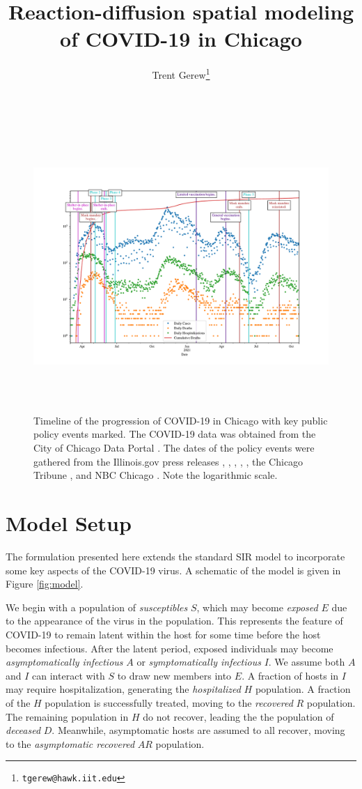 \documentclass[11pt]{article}
\title{Reaction-diffusion spatial modeling of COVID-19 in Chicago}
\author{Trent Gerew\thanks{\texttt{tgerew@hawk.iit.edu}}}
\institute{Department of Applied Mathematics, Illinois Institute of Technology, Chicago, Illinois}
\begin{document}
\maketitle

	\begin{figure}[h]
		\centering
		\includegraphics[height=11cm]{chicago-data2}
		
		\caption{Timeline of the progression of COVID-19 in Chicago with key public policy events marked.
			The COVID-19 data was obtained from the City of Chicago Data Portal \cite{Chicago-cases}.
			The dates of the policy events were gathered from the Illinois.gov press releases \cite{phase-5}, \cite{mask-lift}, \cite{full-vax}, \cite{start-vax}, \cite{phase-4}, the Chicago Tribune \cite{phase-3}, and NBC Chicago \cite{phase-2}.
			Note the logarithmic scale.}
		\label{fig:data}
	\end{figure}

\section{Model Setup}
	The formulation presented here extends the standard SIR model to incorporate some key aspects of the COVID-19 virus.
	A schematic of the model is given in Figure \ref{fig:model}.
	
	We begin with a population of \textit{susceptibles} $S$, which may become \textit{exposed} $E$ due to the appearance of the virus in the population.
	This represents the feature of COVID-19 to remain latent within the host for some time before the host becomes infectious.
	After the latent period, exposed individuals may become \textit{asymptomatically infectious} $A$ or \textit{symptomatically infectious} $I$.
	We assume both $A$ and $I$ can interact with $S$ to draw new members into $E$.
	A fraction of hosts in $I$ may require hospitalization, generating the \textit{hospitalized} $H$ population.
	A fraction of the $H$ population is successfully treated, moving to the \textit{recovered} $R$ population.
	The remaining population in $H$ do not recover, leading the the population of \textit{deceased} $D$.
	Meanwhile, asymptomatic hosts are assumed to all recover, moving to the \textit{asymptomatic recovered} $AR$ population.
	
\end{document}
